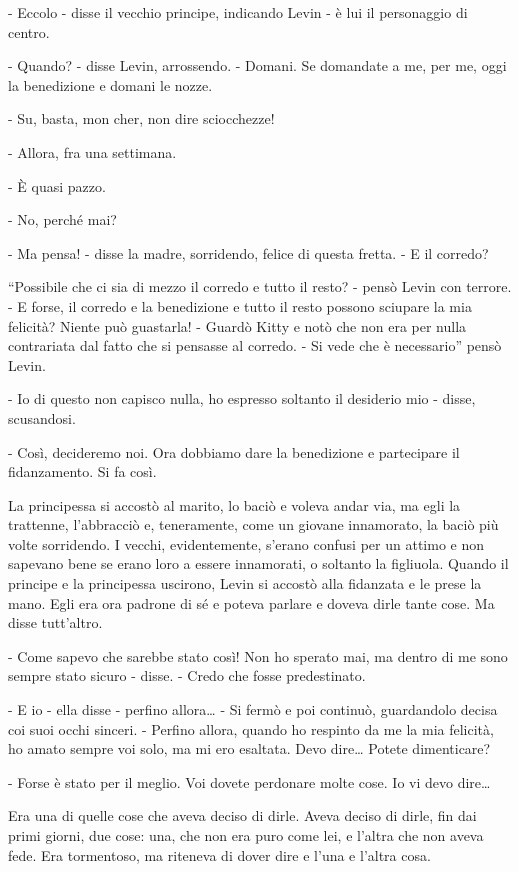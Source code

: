 - Eccolo - disse il vecchio principe, indicando Levin - è lui il personaggio di centro. 

- Quando? - disse Levin, arrossendo. - Domani. Se domandate a me, per me, oggi la benedizione e domani le nozze. 

- Su, basta, mon cher, non dire sciocchezze! 

- Allora, fra una settimana. 

- È quasi pazzo. 

- No, perché mai? 

- Ma pensa! - disse la madre, sorridendo, felice di questa fretta. - E il corredo? 

``Possibile che ci sia di mezzo il corredo e tutto il resto? - pensò Levin con terrore. - E forse, il corredo e la benedizione e tutto il resto possono sciupare la mia felicità? Niente può guastarla! - Guardò Kitty e notò che non era per nulla contrariata dal fatto che si pensasse al corredo. - Si vede che è necessario'' pensò Levin. 

- Io di questo non capisco nulla, ho espresso soltanto il desiderio mio - disse, scusandosi. 

- Così, decideremo noi. Ora dobbiamo dare la benedizione e partecipare il fidanzamento. Si fa così. 

La principessa si accostò al marito, lo baciò e voleva andar via, ma egli la trattenne, l'abbracciò e, teneramente, come un giovane innamorato, la baciò più volte sorridendo. I vecchi, evidentemente, s'erano confusi per un attimo e non sapevano bene se erano loro a essere innamorati, o soltanto la figliuola. Quando il principe e la principessa uscirono, Levin si accostò alla fidanzata e le prese la mano. Egli era ora padrone di sé e poteva parlare e doveva dirle tante cose. Ma disse tutt'altro. 

- Come sapevo che sarebbe stato così! Non ho sperato mai, ma dentro di me sono sempre stato sicuro - disse. - Credo che fosse predestinato. 

- E io - ella disse - perfino allora\ldots{} - Si fermò e poi continuò, guardandolo decisa coi suoi occhi sinceri. - Perfino allora, quando ho respinto da me la mia felicità, ho amato sempre voi solo, ma mi ero esaltata. Devo dire\ldots{} Potete dimenticare? 

- Forse è stato per il meglio. Voi dovete perdonare molte cose. Io vi devo dire\ldots{} 

Era una di quelle cose che aveva deciso di dirle. Aveva deciso di dirle, fin dai primi giorni, due cose: una, che non era puro come lei, e l'altra che non aveva fede. Era tormentoso, ma riteneva di dover dire e l'una e l'altra cosa. 


